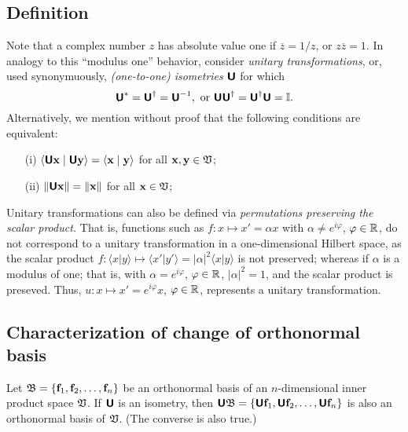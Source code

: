 \subsection {Definition}
Note that a complex number $z$ has absolute value one if $\overline{z}=1/z$, or $z\overline{z}=1$.
In analogy to this ``modulus one'' behavior,
consider {\em unitary transformations}, or, used synonymuously, {\em (one-to-one) isometries}
$\textsf{\textbf{U}}$ for which
\begin{equation}
\textsf{\textbf{U}}^*= \textsf{\textbf{U}}^\dagger =\textsf{\textbf{U}}^{-1},
\textrm{ or } \textsf{\textbf{U}}\textsf{\textbf{U}}^\dagger =\textsf{\textbf{U}}^\dagger \textsf{\textbf{U}}={\Bbb I}.
\end{equation}
Alternatively, we mention without proof that the following conditions are equivalent:
\begin{itemize}
\item[(i)]
$\langle \textsf{\textbf{U}}{\bf x}\mid \textsf{\textbf{U}}{\bf y} \rangle
=
\langle {\bf x}\mid {\bf y} \rangle$ for all ${\bf x} ,{\bf y} \in {\frak V}$;
\item[(ii)]
$\| \textsf{\textbf{U}}{\bf x}\|
=
\|{\bf x}\|$ for all ${\bf x}  \in {\frak V}$;
\end{itemize}

Unitary transformations can also be defined via {\em permutations preserving the scalar product.}
That is, functions such as
$f: x \mapsto x' =\alpha x$ with $\alpha \neq e^{i\varphi}$, $\varphi \in {\Bbb R}$,
do not correspond to a  unitary transformation in a one-dimensional Hilbert space, as
the scalar product $f:
\langle x \vert y \rangle
\mapsto
\langle x'\vert y'\rangle = \vert \alpha \vert^2 \langle x\vert y\rangle$
is not preserved; whereas if $\alpha$ is a modulus of one; that is,
with $\alpha = e^{i\varphi}$, $\varphi \in {\Bbb R}$,
$\vert \alpha \vert^2=1$, and the scalar product is preseved.
Thus, $u: x \mapsto x' =e^{i\varphi} x$, $\varphi \in {\Bbb R}$,
represents a unitary transformation.

\subsection {Characterization of change of orthonormal basis}

Let ${\frak B}=\{{\bf f}_1,  {\bf f}_2, \ldots , {\bf f}_n\}$
be an orthonormal basis of an $n$-dimensional inner product space ${\frak V}$.
If
$\textsf{\textbf{U}}$ is an isometry, then
 $\textsf{\textbf{U}}{\frak B}=\{\textsf{\textbf{U}}{\bf f}_1, \textsf{\textbf{U}} {\bf f}_2,
\ldots ,\textsf{\textbf{U}} {\bf f}_n\}$
is also an orthonormal basis of  ${\frak V}$.
(The converse is also true.)


